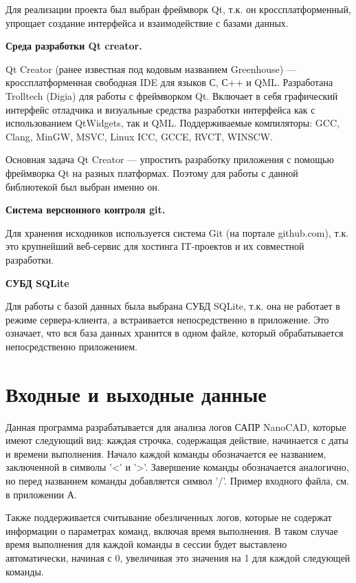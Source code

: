 
Для реализации проекта был выбран фреймворк Qt, т.к. он кроссплатформенный, упрощает создание интерфейса и взаимодействие с базами данных.

\noindent\textbf{Среда разработки Qt creator.}

Qt Creator (ранее известная под кодовым названием Greenhouse) — кроссплатформенная свободная IDE для языков С, С++ и QML. Разработана Trolltech (Digia) для работы с фреймворком Qt. Включает в себя графический интерфейс отладчика и визуальные средства разработки интерфейса как с использованием QtWidgets, так и QML. Поддерживаемые компиляторы: GCC, Clang, MinGW, MSVC, Linux ICC, GCCE, RVCT, WINSCW.

Основная задача Qt Creator — упростить разработку приложения с помощью фреймворка Qt на разных платформах. Поэтому для работы с данной библиотекой был выбран именно он.

\noindent\textbf{Система версионного контроля git.}

Для хранения исходников используется система Git (на портале github.com), т.к. это крупнейший веб-сервис для хостинга IT-проектов и их совместной разработки. %

\noindent\textbf{СУБД SQLite}

Для работы с базой данных была выбрана СУБД SQLite, т.к. она не работает в режиме сервера-клиента, а встраивается непосредственно в приложение. Это означает, что вся база данных хранится в одном файле, который обрабатывается непосредственно приложением.

\section{Входные и выходные данные}
Данная программа разрабатывается для анализа логов САПР NanoCAD, которые имеют следующий вид: каждая строчка, содержащая действие, начинается с даты и времени выполнения. Начало каждой команды обозначается ее названием, заключенной в символы '<' и '>'. Завершение команды обозначается аналогично, но перед названием команды добавляется символ '/'. Пример входного файла, см. в приложении А. 

Также поддерживается считывание обезличенных логов, которые не содержат информации о параметрах команд, включая время выполнения. В таком случае время выполнения для каждой команды в сессии будет выставлено автоматически, начиная с 0, увеличивая это значения на 1 для каждой следующей команды.


